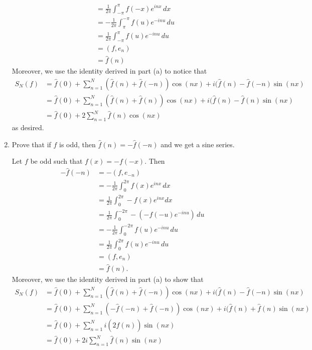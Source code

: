 \documentclass[11pt]{article}
\begin{document}
\begin{problem}
\begin{enumerate}
\begin{solution}
\begin{align*}
    &= \frac{1}{2\pi}\int_{-\pi}^{\pi} f(-x)e^{inx}\,dx\\
    &= -\frac{1}{2\pi}\int_{\pi}^{-\pi} f(u)e^{-inu}\,du\\
    &= \frac{1}{2\pi}\int_{-\pi}^{\pi} f(u)e^{-inu}\,du\\
    &= (f,e_n)\\
    &= \hat{f}(n)
        \end{align*}
Moreover, we use the identity derived in part (a) to notice that
\begin{align*}
    S_N(f) &= \hat{f}(0) + \sum_{n=1}^N (\hat{f}(n) + \hat{f}(-n))\cos(nx) + i(\hat{f} (n) - \hat{f}(-n)\sin(nx)\\
    &= \hat{f}(0) +\sum_{n=1}^N (\hat{f}(n) + \hat{f}(n))\cos(nx) + i(\hat{f} (n) - \hat{f}(n)\sin(nx)\\
    &= \hat{f}(0) +2\sum_{n=1}^N \hat{f}(n)\cos(nx)
\end{align*}
as desired. 
    \end{solution}
\item Prove that if $f$ is odd, then $\hat{f}(n) = -\hat{f}(-n)$ and we get a sine series.
\begin{solution}
    Let $f$ be odd such that $f(x)  = -f(-x).$ Then 
    \begin{align*}
        -\hat{f}(-n) &= -(f,e_{-n})\\
        &= - \frac{1}{2\pi}\int_0^{2\pi} f(x)e^{inx}\,dx\\
        &= \frac{1}{2\pi}\int_0^{2\pi} -f(x)e^{inx}dx\\
        &= \frac{1}{2\pi}\int_0^{-2\pi} -(-f(-u)e^{-inu})\,du\\
        &= -\frac{1}{2\pi}\int_0^{-2\pi}f(u)e^{-inu}\,du\\
        &= \frac{1}{2\pi}\int_0^{2\pi}f(u)e^{-inu}\,du\\
        &= (f,e_n)\\
        &= \hat{f}(n).
    \end{align*}
Moreover, we use the identity derived in part (a) to show that 
\begin{align*}
    S_N(f) &= \hat{f}(0) + \sum_{n=1}^N (\hat{f}(n) + \hat{f}(-n))\cos(nx) + i(\hat{f} (n) - \hat{f}(-n)\sin(nx)\\
    &= \hat{f}(0) + \sum_{n=1}^N (-\hat{f}(-n) + \hat{f}(-n))\cos(nx) + i(\hat{f} (n) + \hat{f}(n)\sin(nx)\\
    &= \hat{f}(0) + \sum_{n=1}^N i(2\hat{f} (n))\sin(nx)\\
    &= \hat{f}(0) + 2i\sum_{n=1}^N \hat{f} (n)\sin(nx)

\end{align*}
\end{solution}
\end{enumerate}
\end{problem}
\end{document}
